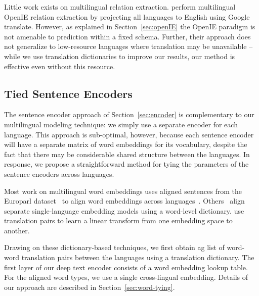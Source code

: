 Little work exists on multilingual relation extraction. \citet{faruqui2015multilingual} perform multilingual OpenIE relation extraction by projecting all languages to English using Google translate. However, as explained in Section~\ref{sec:openIE} the OpenIE paradigm is not amenable to prediction within a fixed schema. Further, their approach does not generalize to low-resource languages where translation may be unavailable -- while we use translation dictionaries to improve our results, our method is effective even without this resource.



\subsection{Tied Sentence Encoders \label{sec:tie-words}}
The sentence encoder approach of Section~\ref{sec:encoder} is complementary to our multilingual modeling technique: we simply use a separate encoder for each language.  This approach is sub-optimal, however, because each sentence encoder will have a separate matrix of word embeddings for its vocabulary, despite the fact that there may be considerable shared structure between the languages. In response, we propose a straightforward method for tying the parameters of the sentence encoders across languages. 

Most work on multilingual word embeddings uses aligned sentences from the Europarl dataset~\citep{koehn2005europarl} to align word embeddings across languages~\citep{Gouws2015,luong2015bilingual,hermann2014multilingual}. Others~\citep{mikolov2013,faruqui2014retrofitting} align separate single-language embedding models using a word-level dictionary. \citet{mikolov2013} use translation pairs to learn a linear transform from one embedding space to another.

Drawing on these dictionary-based techniques, we first obtain ag list of word-word translation pairs between the languages using a translation dictionary. The first layer of our deep text encoder consists of a word embedding lookup table. For the aligned word types, we use a single cross-lingual embedding. Details of our approach are described in Section~\ref{sec:word-tying}.

